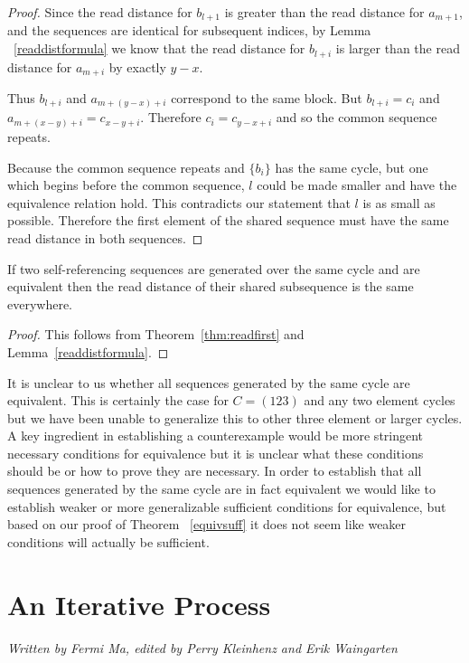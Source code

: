 \documentclass[runningheads,a4paper]{llncs}
\begin{document}
\begin{proof}
Since the read distance for $b_{l+1}$ is greater than the read distance for $a_{m+1}$, and the sequences are identical for subsequent indices, by Lemma ~\ref{readdistformula} we know that the read distance for $b_{l+i}$ is larger than the read distance for $a_{m+i}$ by exactly $y-x$. 

Thus $b_{l+i}$ and $a_{m+(y-x)+i}$ correspond to the same block. But $b_{l+i} = c_{i}$ and $a_{m+(x-y)+i}=c_{x-y+i}$. Therefore $c_{i} = c_{y-x+i}$ and so the common sequence repeats. 

Because the common sequence repeats and $\{b_i\}$ has the same cycle, but one which begins before the common sequence, $l$ could be made smaller and have the equivalence relation hold. This contradicts our statement that $l$ is as small as possible. Therefore the first element of the shared sequence must have the same read distance in both sequences. 
\end{proof}

\begin{corollary}
If two self-referencing sequences are generated over the same cycle  and are equivalent then the read distance of their shared subsequence is the same everywhere.
\end{corollary}

\begin{proof}
This follows from Theorem~\ref{thm:readfirst} and Lemma~\ref{readdistformula}.
\end{proof}

It is unclear to us whether all sequences generated by the same cycle are equivalent. This is certainly the case for $C=(123)$ and any two element cycles but we have been unable to generalize this to other three element or larger cycles. A key ingredient in establishing a counterexample would be more stringent necessary conditions for equivalence but it is unclear what these conditions should be or how to prove they are necessary. In order to establish that all sequences generated by the same cycle are in fact equivalent we would like to establish weaker or more generalizable sufficient conditions for equivalence, but based on our proof of Theorem ~\ref{equivsuff} it does not seem like weaker conditions will actually be sufficient. 

\section{An Iterative Process}
\label{iterativeprocess}

\emph{Written by Fermi Ma, edited by Perry Kleinhenz and Erik Waingarten}
\end{document}
